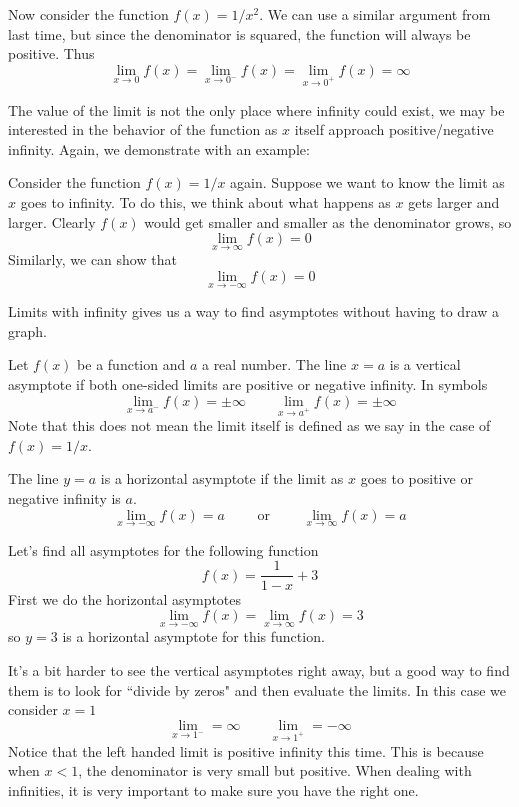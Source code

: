 \begin{example}
	Now consider the function $f(x) = 1/x^2$. We can use a similar argument from last time, but since the denominator is squared, the function will always be positive. Thus
	\[ \lim_{x \to 0} f(x) = \lim_{x \to 0^-} f(x) = \lim_{x \to 0^+} f(x) = \infty \]
\end{example}

The value of the limit is not the only place where infinity could exist, we may be interested in the behavior of the function as $x$ itself approach positive/negative infinity. Again, we demonstrate with an example:

\begin{example}
	Consider the function $f(x) = 1/x$ again. Suppose we want to know the limit as $x$ goes to infinity. To do this, we think about what happens as $x$ gets larger and larger. Clearly $f(x)$ would get smaller and smaller as the denominator grows, so
	\[ \lim_{x \to \infty} f(x) = 0 \]
	Similarly, we can show that
	\[ \lim_{x \to -\infty} f(x) = 0 \]
\end{example}

Limits with infinity gives us a way to find asymptotes without having to draw a graph.
\begin{theorem}
	Let $f(x)$ be a function and $a$ a real number. The line $x = a$ is a vertical asymptote if both one-sided limits are positive or negative infinity. In symbols
	\[ \lim_{x \to a^-} f(x) = \pm \infty \qquad \lim_{x \to a^+} f(x) = \pm \infty \]
	Note that this does not mean the limit itself is defined as we say in the case of $f(x) = 1/x$. 
	
	The line $y = a$ is a horizontal asymptote if the limit as $x$ goes to positive or negative infinity is $a$.
	\[ \lim_{x \to -\infty} f(x) = a \qquad \text{ or } \qquad \lim_{x \to \infty} f(x) = a \]
\end{theorem}

\begin{example}
	Let's find all asymptotes for the following function
	\[ f(x) = \frac{1}{1 - x} + 3 \]
	First we do the horizontal asymptotes
	\[ \lim_{x \to -\infty} f(x) = \lim_{x \to \infty} f(x) = 3 \]
	so $y = 3$ is a horizontal asymptote for this function.
	
	It's a bit harder to see the vertical asymptotes right away, but a good way to find them is to look for ``divide by zeros" and then evaluate the limits. In this case we consider $x = 1$
	\[ \lim_{x \to 1^-} = \infty \qquad \lim_{x \to 1^+} = - \infty \]
	Notice that the left handed limit is positive infinity this time. This is because when $x < 1$, the denominator is very small but positive. When dealing with infinities, it is very important to make sure you have the right one.
\end{example}

